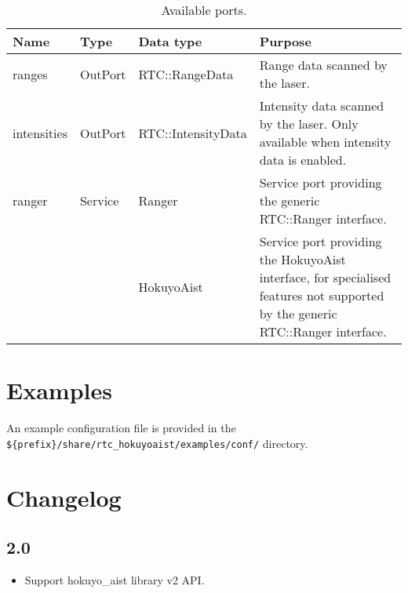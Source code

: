 \documentclass[a4paper,10pt]{article}
\begin{document}
\begin{table}[t]
  \centering
  \begin{tabularx}{\columnwidth}{lllX}
    \toprule
    Name & Type & Data type & Purpose \\
    \midrule
    ranges & OutPort & RTC::RangeData & Range data scanned by the laser. \\
    intensities & OutPort & RTC::IntensityData & Intensity data scanned by the laser. Only available when intensity data is enabled. \\
    ranger & Service & Ranger & Service port providing the generic RTC::Ranger interface. \\
    & & HokuyoAist & Service port providing the HokuyoAist interface, for specialised features not supported by the generic RTC::Ranger interface. \\
    \bottomrule
  \end{tabularx}
  \caption{Available ports.}
  \label{tab:ports}
\end{table}

\section{Examples}
\label{sec:examples}

An example configuration file is provided in the
\verb|${prefix}/share/rtc_hokuyoaist/examples/conf/| directory.

\section{Changelog}

\subsection{2.0}

\begin{itemize}
  \item Support hokuyo\_aist library v2 API.
\end{itemize}
\end{document}
